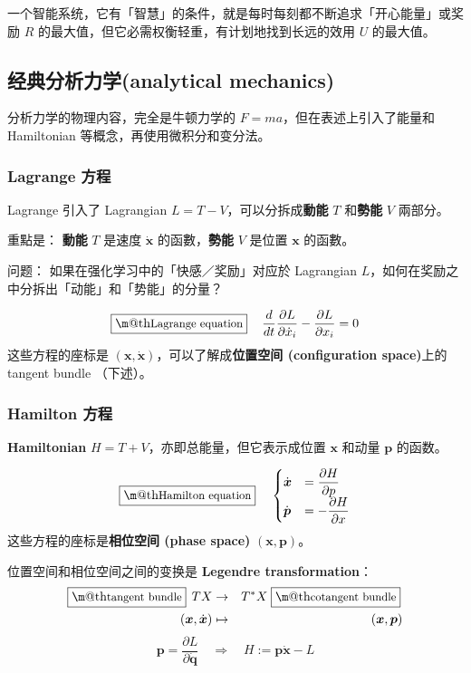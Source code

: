 \documentclass[orivec]{llncs}
\makeatletter
\newcommand{\emp}[1]{\textbf{\textcolor{Cerulean}{#1}}}
\newcommand{\vect}[1]{\boldsymbol{#1}}
\renewcommand{\boxed}[1]{\fbox{\m@th$\displaystyle\scalebox{0.9}{#1}$} \,}
\makeatother
\begin{document}
一个智能系统，它有「智慧」的条件，就是每时每刻都不断追求「开心能量」或奖励 $R$ 的最大值，但它必需权衡轻重，有计划地找到长远的效用 $U$ 的最大值。

\subsection{经典分析力学(analytical mechanics)}

分析力学的物理内容，完全是牛顿力学的 $F = ma$，但在表述上引入了能量和 Hamiltonian 等概念，再使用微积分和变分法。

\subsubsection{Lagrange 方程}

Lagrange 引入了 Lagrangian $L = T - V$，可以分拆成\emp{動能} $T$ 和\emp{勢能} $V$ 兩部分。

重點是： \emp{動能} $T$ 是速度 $\dot{\vect{x}}$ 的函數，\emp{勢能} $V$ 是位置 $\vect{x}$ 的函數。

问题： 如果在强化学习中的「快感／奖励」对应於 Lagrangian $L$，如何在奖励之中分拆出「动能」和「势能」的分量？ 

\begin{equation}
\boxed{\mbox{Lagrange equation}} \quad
\frac{d}{dt} \frac{\partial L}{\partial \dot{x}_i} - \frac{\partial L}{\partial x_i} = 0
\end{equation}
这些方程的座标是 $(\vect{x}, \dot{\vect{x}})$，可以了解成\emp{位置空间 (configuration space)}上的 tangent bundle （下述）。

\subsubsection{Hamilton 方程}

\emp{Hamiltonian} $H = T + V$，亦即总能量，但它表示成位置 $\vect{x}$ 和动量 $\vect{p}$ 的函数。

\begin{equation}
\label{Hamilton-eqns}
  \boxed{\mbox{Hamilton equation}} \quad
  \begin{cases}
      \dot{\vect{x}} & = \displaystyle \frac{\partial H}{\partial p} \\
      \dot{\vect{p}} & = - \displaystyle \frac{\partial H}{\partial x}
  \end{cases}
\end{equation}
这些方程的座标是\emp{相位空间 (phase space)} $(\vect{x}, \vect{p})$。

位置空间和相位空间之间的变换是 \emp{Legendre transformation}：
\begin{eqnarray}
\boxed{\mbox{tangent bundle}} \; T X & \rightarrow & T^* X \; \boxed{\mbox{cotangent bundle}} \\
(\vect{x}, \dot{\vect{x}}) & \mapsto & (\vect{x}, \vect{p})
\end{eqnarray}
\begin{equation}
\vect{p} = \frac{\partial L}{\partial \dot{\vect{q}}} \quad \Rightarrow \quad H := \vect{p} \dot{\vect{x}} - L
\end{equation}
\end{document}
